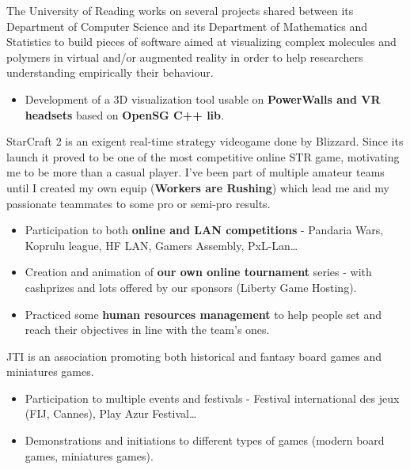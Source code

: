 \documentclass[10pt, a4paper, ragged2e]{altacv}
\begin{document}
		The University of Reading works on several projects shared between its Department of Computer Science and its Department of Mathematics and Statistics to build pieces of software aimed at visualizing complex molecules and polymers in virtual and/or augmented reality in order to help researchers understanding empirically their behaviour. 
		
		\medskip
		\begin{itemize}
			\item Development of a 3D visualization tool usable on \textbf{PowerWalls and VR headsets} based on \textbf{OpenSG C++ lib}.
		\end{itemize}

\bigskip
{}
	
		StarCraft 2 is an exigent real-time strategy videogame done by Blizzard. Since its launch it proved to be one of the most competitive online STR game, motivating me to be more than a casual player. I've been part of multiple amateur teams until I created my own equip (\textbf{Workers are Rushing}) which lead me and my passionate teammates to some pro or semi-pro results.

		\medskip
		\begin{itemize}
			\item Participation to both \textbf{online and LAN competitions} - Pandaria Wars, Koprulu league, HF LAN, Gamers Assembly, PxL-Lan\ldots
			\item Creation and animation of \textbf{our own online tournament} series - with cashprizes and lots offered by our sponsors (Liberty Game Hosting).
			\item Practiced some \textbf{human resources management} to help people set and reach their objectives in line with the team's ones.
		\end{itemize}
	\divider


		JTI is an association promoting both historical and fantasy board games and miniatures games.

		\medskip
		\begin{itemize}
			\item Participation to multiple events and festivals - Festival international des jeux (FIJ, Cannes), Play Azur Festival\ldots
			\item Demonstrations and initiations to different types of games (modern board games, miniatures games).
		\end{itemize}
\end{document}
